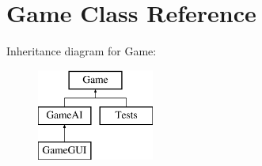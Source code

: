 \hypertarget{classGame}{\section{Game Class Reference}
\label{classGame}
}
Inheritance diagram for Game\+:\begin{figure}[H]
\begin{center}
\leavevmode
\includegraphics[height=3.000000cm]{classGame}
\end{center}
\end{figure}

